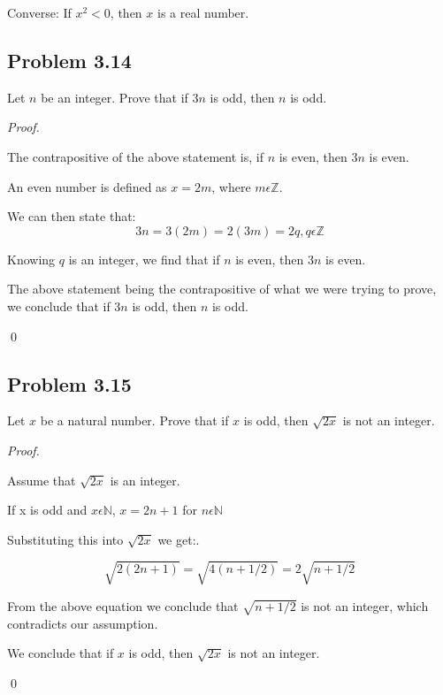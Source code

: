 \documentclass{article}
\begin{document}
Converse: 
If $x^2 < 0$, then $x$ is a real number.


\pagebreak
\subsection{Problem 3.14}
Let $n$ be an integer. Prove that if $3n$ is odd, then $n$ is odd.

\textit{Proof.}
\begin{addmargin}[0.75cm]{0cm}

The contrapositive of the above statement is, if $n$ is even, then $3n$ is even.

An even number is defined as $x=2m$, where $m \epsilon \mathbb{Z}$.

We can then state that:
\begin{equation} 
	3n=3(2m)=2(3m)=2q, q \epsilon \mathbb{Z}
\end{equation}

Knowing $q$ is an integer, we find that if $n$ is even, then $3n$ is even.

The above statement being the contrapositive of what we were trying to prove, we conclude
that if $3n$ is odd, then $n$ is odd.

\qed
\end{addmargin}


\subsection{Problem 3.15}
Let $x$ be a natural number. Prove that if $x$ is odd, then $\sqrt{2x}$ is not an integer.

\textit{Proof.}
\begin{addmargin}[0.75cm]{0cm}
	
	Assume that $\sqrt{2x}$ is an integer.
	
	If x is odd and $x \epsilon \mathbb{N}$, $x = 2n+1$ for $n \epsilon \mathbb{N}$
	
	Substituting this into $\sqrt{2x}$ we get:.
	
	\begin{equation}
		\sqrt{2(2n+1)} = \sqrt{4(n+1/2)} = 2 \sqrt{n+1/2}
	\end{equation}
	
	From the above equation we conclude that $\sqrt{n+1/2}$ is not an integer, which contradicts our assumption.

	We conclude that if $x$ is odd, then $\sqrt{2x}$ is not an integer.
	
	\qed
\end{addmargin}
\end{document}
